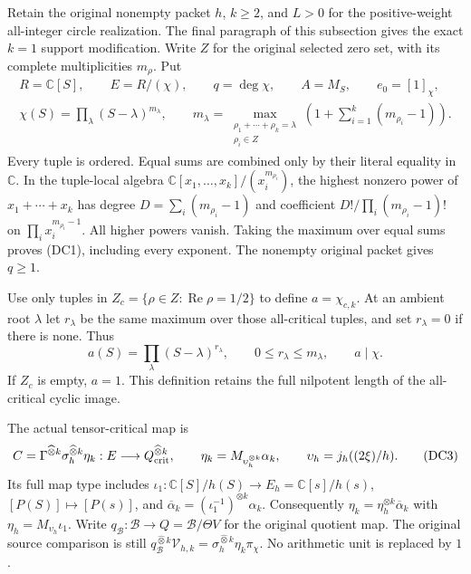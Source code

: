 Retain the original nonempty packet $h$, $k\ge2$, and $L>0$
for the positive-weight all-integer circle
realization.  The final paragraph of this subsection gives the exact
$k=1$ support modification.  Write $Z$ for the original selected zero
set, with its complete multiplicities $m_\rho$.  Put
\[
 \begin{gathered}
 R=\mathbb C[S],\qquad E=R/(\chi),\qquad q=\deg\chi,\qquad
 A=M_S,\qquad e_0=[1]_\chi,\\
 \chi(S)=\prod_{\lambda}(S-\lambda)^{m_\lambda},\qquad
 m_\lambda=\max_{\substack{\rho_1+\cdots+\rho_k=\lambda\\\rho_i\in Z}}
       \left(1+\sum_{i=1}^k(m_{\rho_i}-1)\right).
 \end{gathered}
 \tag{DC1}
\]
Every tuple is ordered.  Equal sums are combined only by their literal
equality in $\mathbb C$.  In the tuple-local algebra
$\mathbb C[x_1,\ldots,x_k]/(x_i^{m_{\rho_i}})$, the highest nonzero
power of $x_1+\cdots+x_k$ has degree
$D=\sum_i(m_{\rho_i}-1)$ and coefficient
$D!/\prod_i(m_{\rho_i}-1)!$ on
$\prod_i x_i^{m_{\rho_i}-1}$.  All higher powers vanish.  Taking the
maximum over equal sums proves (DC1), including every exponent.
The nonempty original packet gives $q\ge1$.

Use only tuples in $Z_c=\{\rho\in Z:\operatorname{Re}\rho=1/2\}$ to
define $a=\chi_{c,k}$.  At an ambient root $\lambda$ let $r_\lambda$
be the same maximum over those all-critical tuples, and set
$r_\lambda=0$ if there is none.  Thus
\[
 a(S)=\prod_\lambda(S-\lambda)^{r_\lambda},\qquad
 0\le r_\lambda\le m_\lambda,\qquad a\mid\chi.
 \tag{DC2}
\]
If $Z_c$ is empty, $a=1$.  This definition retains the full nilpotent
length of the all-critical cyclic image.

The actual tensor-critical map is
\[
 C=\Gamma^{\widehat\otimes k}\sigma_h^{\widehat\otimes k}\eta_k:
 E\longrightarrow Q_{\rm crit}^{\widehat\otimes k},\qquad
 \eta_k=M_{\upsilon_h^{\otimes k}}\alpha_k,\qquad
 \upsilon_h=j_h((2\xi)/h).
 \tag{DC3}
\]
Its full map type includes
$\iota_1:\mathbb C[S]/h(S)\to E_h=\mathbb C[s]/h(s)$,
$[P(S)]\mapsto[P(s)]$, and
$\overline\alpha_k=(\iota_1^{-1})^{\otimes k}\alpha_k$.
Consequently $\eta_k=\eta_h^{\otimes k}\overline\alpha_k$ with
$\eta_h=M_{\upsilon_h}\iota_1$.
Write $q_{\mathscr B}:\mathscr B\to Q=\mathscr B/\Theta V$
for the original quotient map.  The original source comparison is still
$q_{\mathscr B}^{\widehat\otimes k}\mathcal V_{h,k}
=\sigma_h^{\widehat\otimes k}\eta_k\pi_\chi$.
No arithmetic unit is replaced by $1$.

